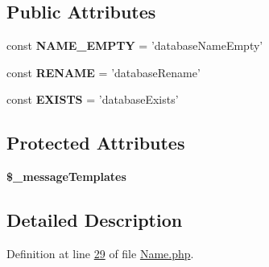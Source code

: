 \subsection*{Public Attributes}
\begin{DoxyCompactItemize}
\item 
\hypertarget{classZendDbSchema__Validate__Db__Schema__Database__Mysql__Name_a3eb5d13c0bb4be108f2c2db2d1f12b17}{const {\bfseries N\-A\-M\-E\-\_\-\-E\-M\-P\-T\-Y} = 'database\-Name\-Empty'}\label{classZendDbSchema__Validate__Db__Schema__Database__Mysql__Name_a3eb5d13c0bb4be108f2c2db2d1f12b17}

\item 
\hypertarget{classZendDbSchema__Validate__Db__Schema__Database__Mysql__Name_a980d5c918137782061b4e8ec079241d0}{const {\bfseries R\-E\-N\-A\-M\-E} = 'database\-Rename'}\label{classZendDbSchema__Validate__Db__Schema__Database__Mysql__Name_a980d5c918137782061b4e8ec079241d0}

\item 
\hypertarget{classZendDbSchema__Validate__Db__Schema__Database__Mysql__Name_af9be2a02fe6fa4f35fd58860bc4ade83}{const {\bfseries E\-X\-I\-S\-T\-S} = 'database\-Exists'}\label{classZendDbSchema__Validate__Db__Schema__Database__Mysql__Name_af9be2a02fe6fa4f35fd58860bc4ade83}

\end{DoxyCompactItemize}
\subsection*{Protected Attributes}
\begin{DoxyCompactItemize}
\item 
{\bfseries \$\-\_\-message\-Templates}
\end{DoxyCompactItemize}


\subsection{Detailed Description}


Definition at line \hyperlink{Database_2Mysql_2Name_8php_source_l00029}{29} of file \hyperlink{Database_2Mysql_2Name_8php_source}{Name.\-php}.



